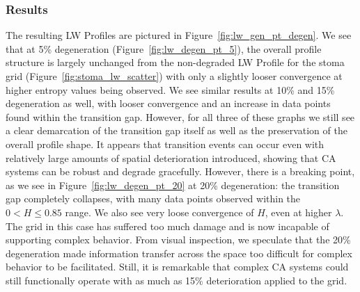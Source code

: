 \documentclass[a4paper,11pt]{article}
\begin{document}
\subsubsection*{Results}

The resulting LW Profiles are pictured in Figure~\ref{fig:lw_gen_pt_degen}. We see that at 5\% degeneration (Figure~\ref{fig:lw_degen_pt_5}), the overall profile structure is largely unchanged from the non-degraded LW Profile for the stoma grid (Figure~\ref{fig:stoma_lw_scatter}) with only a slightly looser convergence at higher entropy values being observed. We see similar results at 10\% and 15\% degeneration as well, with looser convergence and an increase in data points found within the transition gap. However, for all three of these graphs we still see a clear demarcation of the transition gap itself as well as the preservation of the overall profile shape. It appears that transition events can occur even with relatively large amounts of spatial deterioration introduced, showing that CA systems can be robust and degrade gracefully. However, there is a breaking point, as we see in Figure~\ref{fig:lw_degen_pt_20} at 20\% degeneration: the transition gap completely collapses, with many data points observed within the $0 < H \le 0.85$ range. We also see very loose convergence of $H$, even at higher $\lambda$. The grid in this case has suffered too much damage and is now incapable of supporting complex behavior. From visual inspection, we speculate that the 20\% degeneration made information transfer across the space too difficult for complex behavior to be facilitated. Still, it is remarkable that complex CA systems could still functionally operate with as much as 15\% deterioration applied to the grid.
\end{document}
